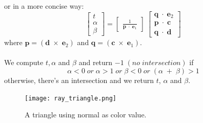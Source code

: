 \documentclass[11pt,a4paper]{article}
\begin{document}
	or in a more concise way:
	\[
	\begin{bmatrix}
		t \\
		\alpha \\
		\beta 
	\end{bmatrix} = \left[
	\begin{array}{ccc}
		\frac{1}{\boldsymbol{p}\;\cdot\;\boldsymbol{e}_{1}}
	\end{array}
	\right]
	\
	\begin{bmatrix}
		\boldsymbol{q}\;\cdot\;\boldsymbol{e}_{2} \\
		\boldsymbol{p}\;\cdot\;\boldsymbol{c} \\
		\boldsymbol{q}\;\cdot\;\boldsymbol{d}
	\end{bmatrix}
	\]
	where $\boldsymbol{p}=(\boldsymbol{d}\;\times\;\boldsymbol{e}_{2})$ and $\boldsymbol{q}=(\boldsymbol{c}\;\times\;\boldsymbol{e}_{1})$.\\~\\
	We compute $t, \alpha$ and $\beta$ and return $-1\;(no\;intersection)$ if 
	\begin{equation}
		\alpha<0\;or\;\alpha>1\;or\;\beta<0\;or\;(\alpha\;+\;\beta)>1
	\end{equation}
	otherwise, there's an intersection and we return $t$, $\alpha$ and $\beta$.
	\begin{figure}[htp]
		\centering
		\texttt{[image: ray\_triangle.png]}\quad
		\caption{A triangle using normal as color value.}
	\end{figure}
\end{document}

